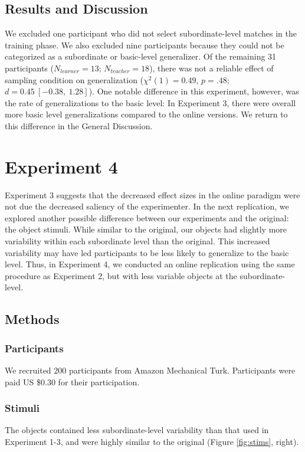 \documentclass[man]{apa2}
\begin{document}
\subsection{Results and Discussion}
We excluded one participant who did not select subordinate-level matches in the training phase. We also excluded nine participants because they could not be categorized as a subordinate or basic-level generalizer. Of the remaining 31 participants ($N_{learner} = 13$; $N_{teacher} = 18$), there was not a reliable effect of sampling condition on generalization ($\chi^2(1) = 0.49$, $p = .48$; $d = 0.45\ [-0.38,\ 1.28]$). One notable difference in this experiment, however, was the rate of generalizations to the basic level: In Experiment 3, there were overall more basic level generalizations compared to the online versions. We return to this difference in the General Discussion.

\section{Experiment 4}
Experiment 3 suggests that the decreased effect sizes in the online paradigm were not due the decreased saliency of the experimenter. In the next replication, we explored another possible difference between our experiments and the original: the object stimuli. While similar to the original, our objects had slightly more variability within each subordinate level than the original. This increased variability may have led participants to be less likely to generalize to the basic level. Thus, in Experiment 4, we conducted an online replication using the same procedure as Experiment 2, but with less variable objects at the subordinate-level. 

\subsection{Methods}

\subsubsection{Participants}  We recruited 200 participants from Amazon Mechanical Turk. Participants were paid US \$0.30 for their participation.

\subsubsection{Stimuli}
The objects contained less subordinate-level variability than that used in Experiment 1-3, and were highly similar to the original (Figure \ref{fig:stims}, right).
\end{document}
